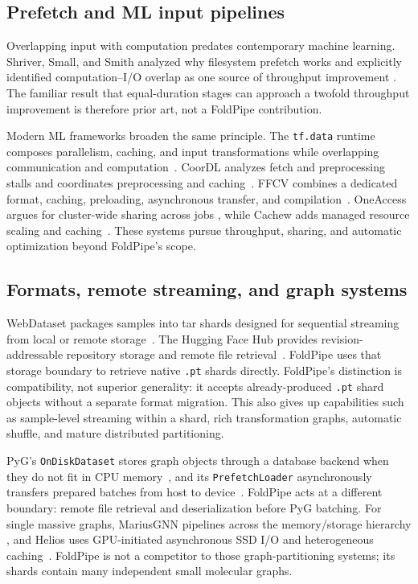 \documentclass[10pt]{article}
\begin{document}
\subsection{Prefetch and ML input pipelines}

Overlapping input with computation predates contemporary machine learning.
Shriver, Small, and Smith analyzed why filesystem prefetch works and explicitly
identified computation--I/O overlap as one source of throughput improvement
\cite{shriver1999prefetching}.  The familiar result that equal-duration stages
can approach a twofold throughput improvement is therefore prior art, not a
FoldPipe contribution.

Modern ML frameworks broaden the same principle.  The \texttt{tf.data}
runtime composes parallelism, caching, and input transformations while
overlapping communication and computation~\cite{murray2021tfdata}.  CoorDL
analyzes fetch and preprocessing stalls and coordinates preprocessing and
caching~\cite{mohan2021stalls}.  FFCV combines a dedicated format, caching,
preloading, asynchronous transfer, and compilation~\cite{leclerc2023ffcv}.
OneAccess argues for cluster-wide sharing across jobs
\cite{kakaraparthy2019oneaccess}, while Cachew adds managed resource scaling and
caching~\cite{graur2022cachew}.  These systems pursue throughput, sharing, and
automatic optimization beyond FoldPipe's scope.

\subsection{Formats, remote streaming, and graph systems}

WebDataset packages samples into tar shards designed for sequential streaming
from local or remote storage~\cite{aizman2020webdataset}. The Hugging Face Hub
provides revision-addressable repository storage and remote file
retrieval~\cite{huggingfacehub}. FoldPipe uses that storage boundary to
retrieve native \texttt{.pt} shards directly. FoldPipe's distinction is compatibility,
not superior generality: it accepts already-produced \texttt{.pt} shard objects
without a separate format migration.  This also gives up capabilities such as
sample-level streaming within a shard, rich transformation graphs, automatic
shuffle, and mature distributed partitioning.

PyG's \texttt{OnDiskDataset} stores graph objects through a database backend
when they do not fit in CPU memory~\cite{pygondiskdocs}, and its
\texttt{PrefetchLoader} asynchronously transfers prepared batches from host to
device~\cite{pygloaderdocs}.  FoldPipe acts at a different boundary: remote
file retrieval and deserialization before PyG batching.  For single massive
graphs, MariusGNN pipelines across the memory/storage hierarchy
\cite{waleffe2023mariusgnn}, and Helios uses GPU-initiated asynchronous SSD I/O
and heterogeneous caching~\cite{sun2023helios}.  FoldPipe is not a competitor
to those graph-partitioning systems; its shards contain many independent small
molecular graphs.
\end{document}
